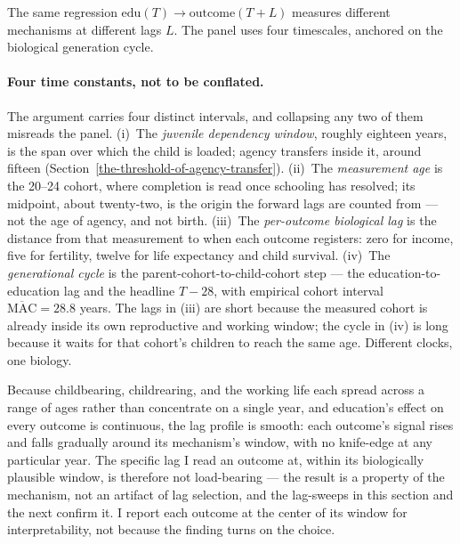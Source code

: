 \documentclass[12pt,letterpaper]{article}
\begin{document}
The same regression $\text{edu}(T) \to \text{outcome}(T{+}L)$ measures
different mechanisms at different lags $L$. The panel uses four
timescales, anchored on the biological generation cycle.

\paragraph{Four time constants, not to be conflated.} The argument
carries four distinct intervals, and collapsing any two of them
misreads the panel. (i)~The \emph{juvenile dependency window}, roughly
eighteen years, is the span over which the child is loaded; agency
transfers inside it, around fifteen
(Section~\ref{the-threshold-of-agency-transfer}). (ii)~The
\emph{measurement age} is the 20--24 cohort, where completion is read
once schooling has resolved; its midpoint, about twenty-two, is the
origin the forward lags are counted from --- not the age of agency, and
not birth. (iii)~The \emph{per-outcome biological lag} is the distance
from that measurement to when each outcome registers: zero for income,
five for fertility, twelve for life expectancy and child survival.
(iv)~The \emph{generational cycle} is the parent-cohort-to-child-cohort
step --- the education-to-education lag and the headline $T{-}28$, with
empirical cohort interval $\overline{\mathrm{MAC}} = 28.8$ years. The
lags in (iii) are short because the measured cohort is already inside
its own reproductive and working window; the cycle in (iv) is long
because it waits for that cohort's children to reach the same age.
Different clocks, one biology.

Because childbearing, childrearing, and the working life each spread
across a range of ages rather than concentrate on a single year, and
education's effect on every outcome is continuous, the lag profile is
smooth: each outcome's signal rises and falls gradually around its
mechanism's window, with no knife-edge at any particular year. The
specific lag I read an outcome at, within its biologically plausible
window, is therefore not load-bearing --- the result is a property of
the mechanism, not an artifact of lag selection, and the lag-sweeps in
this section and the next confirm it. I report each outcome at the
center of its window for interpretability, not because the finding
turns on the choice.
\end{document}
